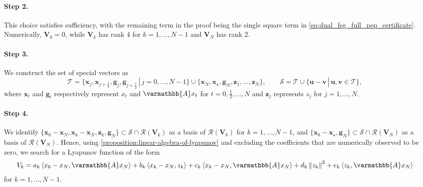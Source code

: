 \documentclass{article}
\theoremstyle{definition}
\theoremstyle{plain}
\newcommand{\vg}{{\mathbf{g}}}
\newcommand{\vu}{{\mathbf{u}}}
\newcommand{\vv}{{\mathbf{v}}}
\newcommand{\vx}{{\mathbf{x}}}
\newcommand{\vz}{{\mathbf{z}}}
\newcommand{\vV}{{\mathbf{V}}}
\newcommand{\cR}{{\mathcal{R}}}
\newcommand{\cS}{{\mathcal{S}}}
\newcommand{\cT}{{\mathcal{T}}}
\newcommand{\opA}{{\varmathbb{A}}}
\newcommand{\inprod}[2]{\left\langle #1,#2 \right\rangle}
\newcommand{\sqnorm}[1]{\left\| #1 \right\|^2}
\begin{document}
\paragraph{Step 2.}
This choice satisfies sufficiency, with the remaining term in the proof being the single square term in \eqref{eq:dual_feg_full_pep_certificate}.
Numerically, $\vV_0=0$, while $\vV_k$ has rank $4$ for $k=1,\dots,N-1$ and $\vV_N$ has rank $2$.

\paragraph{Step 3.}
We construct the set of special vectors as
\[
    \cT=\{\vx_j,\vx_{j+\frac12},\vg_j,\vg_{j+\frac12} \,|\, j=0,\dots,N-1\}
    \cup\{\vx_N,\vx_\star,\vg_N,\vz_1,\dots,\vz_N\},
    \qquad
    \cS=\cT\cup\{\vu-\vv \,|\, \vu,\vv\in\cT\},
\]
where $\vx_t$ and $\vg_t$ respectively represent $x_t$ and $\opA x_t$ for $t=0,\frac{1}{2},\dots,N$ and $\vz_j$ represents $z_j$ for $j=1,\dots,N$.

\paragraph{Step 4.}
We identify $\{\vx_0-\vx_N,\vx_k-\vx_N,\vz_k,\vg_N\}\subset\cS\cap\cR(\vV_k)$ as a basis of $\cR(\vV_k)$ for $k=1,\dots,N-1$, and $\{\vx_0-\vx_\star,\vg_N\}\subset\cS\cap\cR(\vV_N)$ as a basis of $\cR(\vV_N)$.
Hence, using \cref{proposition:linear-algebra-of-lyapunov} and excluding the coefficients that are numerically observed to be zero, we search for a Lyapunov function of the form
\begin{align*}
    V_k
    =
    a_k\inprod{x_0-x_N}{\opA x_N}
    +b_k\inprod{x_k-x_N}{z_k}
    +c_k\inprod{x_k-x_N}{\opA x_N}
    +d_k\sqnorm{z_k}
    +e_k\inprod{z_k}{\opA x_N}
\end{align*}
for $k=1,\dots,N-1$.
\end{document}
